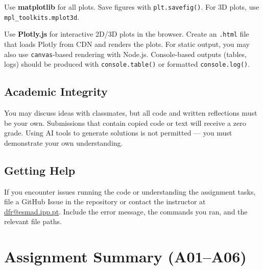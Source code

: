 \documentclass[a4paper,11pt]{article}
\begin{document}
\begin{pythonbox}
  Use \textbf{matplotlib} for all plots. Save figures with \texttt{plt.savefig()}. For 3D plots, use \texttt{mpl\_toolkits.mplot3d}.
\end{pythonbox}

\begin{jsbox}
  Use \textbf{Plotly.js} for interactive 2D/3D plots in the browser. Create an \texttt{.html} file that loads Plotly from CDN and renders the plots. For static output, you may also use \texttt{canvas}-based rendering with Node.js. Console-based outputs (tables, logs) should be produced with \texttt{console.table()} or formatted \texttt{console.log()}.
\end{jsbox}

\subsection{Academic Integrity}

You may discuss ideas with classmates, but all code and written reflections must be your own. Submissions that contain copied code or text will receive a zero grade. Using AI tools to generate solutions is not permitted --- you must demonstrate your own understanding.

\subsection{Getting Help}

If you encounter issues running the code or understanding the assignment tasks, file a GitHub Issue in the repository or contact the instructor at \href{mailto:dfr@esmad.ipp.pt}{dfr@esmad.ipp.pt}. Include the error message, the commands you ran, and the relevant file paths.

\newpage

\section{Assignment Summary (A01--A06)}
\end{document}
